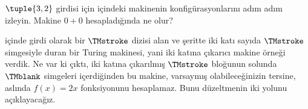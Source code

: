 \documentclass[../../../include/open-logic-section]{subfiles}
\begin{document}
\begin{prob}
$\tuple{3,2}$ girdisi için  içindeki makinenin
konfigürasyonlarını adım adım izleyin. Makine $0+0$ hesapladığında ne olur?
\end{prob}

\begin{explain}
 içinde girdi olarak bir $\TMstroke$ dizisi alan ve
şeritte iki katı sayıda $\TMstroke$ simgesiyle duran bir Turing makinesi,
yani iki katına çıkarıcı makine örneği verdik. Ne var ki çıktı, iki katına
çıkarılmış $\TMstroke$ bloğunun solunda $\TMblank$ simgeleri içerdiğinden
bu makine, varsaymış olabileceğinizin tersine, aslında $f(x)=2x$
fonksiyonunu hesaplamaz. Bunu düzeltmenin iki yolunu açıklayacağız.
\end{explain}
\end{document}
